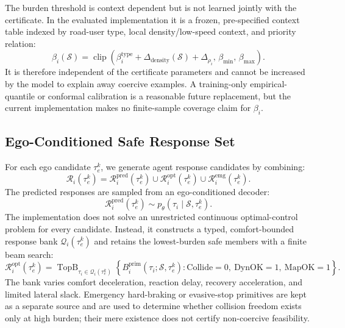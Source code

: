 \documentclass[10pt]{article}
\begin{document}
The burden threshold is context dependent but is not learned jointly with the certificate. In the evaluated implementation it is a frozen, pre-specified context table indexed by road-user type, local density/low-speed context, and priority relation:
\begin{equation}
    \beta_i(\mathcal{S})
    =\operatorname{clip}\!\left(\beta^{\mathrm{type}}_i+\Delta_{\mathrm{density}}(\mathcal{S})+\Delta_{\rho_i},\,\beta_{\min},\,\beta_{\max}\right).
\end{equation}
It is therefore independent of the certificate parameters and cannot be increased by the model to explain away coercive examples. A training-only empirical-quantile or conformal calibration is a reasonable future replacement, but the current implementation makes no finite-sample coverage claim for $\beta_i$.

\subsection{Ego-Conditioned Safe Response Set}
\label{app:safe_response}

For each ego candidate $\tau^k_e$, we generate agent response candidates by combining:
\begin{equation}
    \mathcal{R}_i(\tau^k_e)
    =
    \mathcal{R}^{\mathrm{pred}}_i(\tau^k_e)
    \cup
    \mathcal{R}^{\mathrm{opt}}_i(\tau^k_e)
    \cup
    \mathcal{R}^{\mathrm{emg}}_i(\tau^k_e).
\end{equation}
The predicted responses are sampled from an ego-conditioned decoder:
\begin{equation}
    \mathcal{R}^{\mathrm{pred}}_i(\tau^k_e)
    \sim
    p_\theta(\tau_i \mid \mathcal{S},\tau^k_e).
\end{equation}
The implementation does not solve an unrestricted continuous optimal-control problem for every candidate. Instead, it constructs a typed, comfort-bounded response bank $\mathcal{Q}_i(\tau_e^k)$ and retains the lowest-burden safe members with a finite beam search:
\begin{equation}
    \mathcal{R}^{\mathrm{opt}}_i(\tau_e^k)
    =\operatorname{TopB}_{\tau_i\in\mathcal{Q}_i(\tau_e^k)}
    \left\{B_i^{\mathrm{prim}}(\tau_i;\mathcal{S},\tau_e^k):
    \mathrm{Collide}=0,\ \mathrm{DynOK}=1,\ \mathrm{MapOK}=1\right\}.
\end{equation}
The bank varies comfort deceleration, reaction delay, recovery acceleration, and limited lateral slack. Emergency hard-braking or evasive-stop primitives are kept as a separate source and are used to determine whether collision freedom exists only at high burden; their mere existence does not certify non-coercive feasibility.
\end{document}
